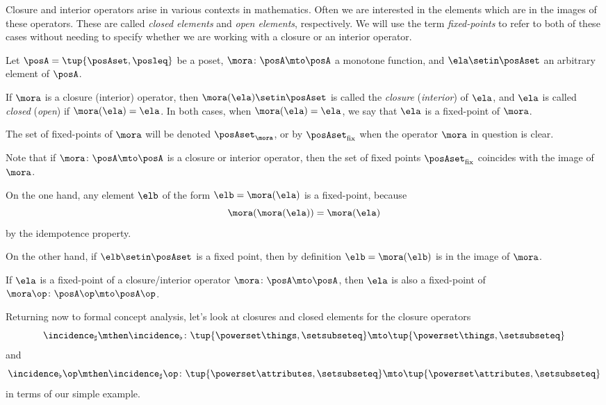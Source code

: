 Closure and interior operators arise in various contexts in mathematics.
Often we are interested in the elements which are in the images of these operators.
These are called \emph{closed elements} and \emph{open elements}, respectively.
We will use the term \emph{fixed-points} to refer to both of these cases without needing to specify whether we are working with a closure or an interior operator.

\begin{ctdefinition}\label{def:closure-closed-elements}
    Let $\posA = \tup{\posAset, \posleq}$ be a poset, $\mora \colon \posA \mto \posA$ a monotone function, and $\ela \setin \posAset$ an arbitrary element of $\posA$.

    If $\mora$ is a closure (interior) operator, then $\mora(\ela) \setin \posAset$ is called the \emph{closure} (\emph{interior}) of $\ela$, and $\ela$ is called \emph{closed} (\emph{open}) if $\mora(\ela) = \ela$.
    In both cases, when $\mora(\ela) = \ela$, we say that $\ela$ is a fixed-point of $\mora$.

    The set of fixed-points of $\mora$ will be denoted $\posAset_\mora$, or by $\posAset_{\text{fix}}$ when the operator $\mora$ in question is clear.
\end{ctdefinition}

\begin{remark}\label{rem:closed-elements-are-image}
    Note that if $\mora \colon \posA \mto \posA$ is a closure or interior operator, then the set of fixed points $\posAset_{\text{fix}}$ coincides with the image of $\mora$.

    On the one hand, any element $\elb$ of the form $\elb = \mora(\ela)$ is a fixed-point, because
    \begin{equation}
        \mora(\mora(\ela)) = \mora(\ela)
    \end{equation}
    by the idempotence property.

    On the other hand, if $\elb \setin \posAset$ is a fixed point, then by definition $\elb = \mora(\elb)$ is in the image of $\mora$.
\end{remark}

\begin{remark}\label{rem:fixed-points-coincide-closure-or-interior}
    If $\ela$ is a fixed-point of a closure/interior operator $\mora \colon \posA \mto \posA$, then $\ela$ is also a fixed-point of $\mora\op \colon \posA\op \mto \posA\op$.
\end{remark}

Returning now to formal concept analysis, let's look at closures and closed elements for the closure operators
$$\incidence_\sharp \mthen \incidence_\flat \colon \tup{\powerset \things, \setsubseteq} \mto \tup{\powerset \things, \setsubseteq}$$
and
$$\incidence_\flat\op \mthen \incidence_\sharp\op \colon \tup{\powerset \attributes, \setsubseteq} \mto \tup{\powerset \attributes, \setsubseteq} $$
in terms of our simple example.

